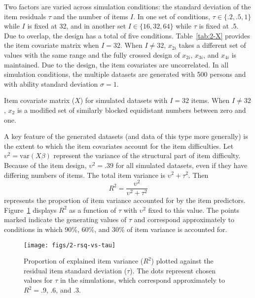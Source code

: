 Two factors are varied across simulation conditions: the standard deviation of the item residuals $\tau$ and the number of items $I$. In one set of conditions, 
$\tau \in \{.2, .5, 1\}$ while $I$ is fixed at 32, 
and in another set 
$I \in \{16, 32, 64\}$ while $\tau$ is fixed at .5.
Due to overlap, the design has a total of five conditions. Table~\ref{tab:2-X} provides the item covariate matrix when $I=32$. When $I \ne 32$, $x_{2i}$ takes a different set of values with the same range and the fully crossed design of $x_{2i}$, $x_{3i}$, and $x_{4i}$ is maintained. Due to the design, the item covariates are uncorrelated. In all simulation conditions, the multiple datasets are generated with 500 persons and with ability standard deviation $\sigma = 1$.

\begin{table}
	\label{tab:2-X}
	\centering
	
	\caption{Item covariate matrix ($X$) for simulated datasets with $I = 32$ items. When $I \ne 32$, $x_2$ is a modified set of similarly blocked equidistant numbers between zero and one.}
\end{table}

A key feature of the generated datasets (and data of this type more generally) is the
extent to which the item covariates account for the item difficulties. Let 
$\upsilon^2 = \mathrm{var}(X\beta)$ 
represent the variance of the structural part of item difficulty. Because of the item design, $\upsilon^2 = .39$ for all simulated datasets, even if they have differing numbers of items. The total item variance is 
$\upsilon^2 + \tau^2$. Then
\begin{equation} 
	R^2 = \frac{\upsilon^2}{\upsilon^2 + \tau^2}
\end{equation}
represents the proportion of item variance accounted for by the item predictors. Figure~\ref{fig:2-rsq-vs-tau} displays $R^2$ as a function of $\tau$ with $\upsilon^2$ fixed to this value. The points marked indicate the generating values of $\tau$ and correspond approximately to conditions in which 90\%, 60\%, and 30\% of item variance is accounted for.

\begin{figure}[tbp]
	\label{fig:2-rsq-vs-tau}
	\centering
	\texttt{[image: figs/2-rsq-vs-tau]}
	\caption{Proportion of explained item variance ($R^2$) plotted against the residual item standard deviation ($\tau$). The dots represent chosen values for $\tau$ in the simulations, which correspond approximately to $R^2 = .9$, .6, and .3.}
\end{figure}



